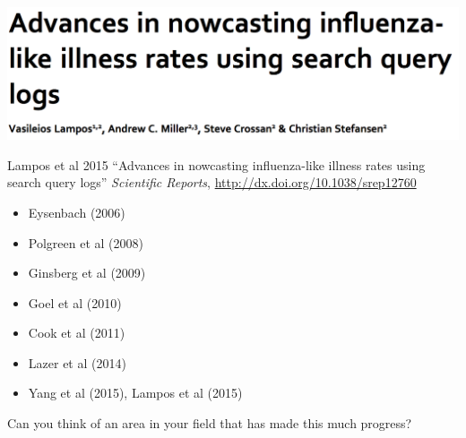 \documentclass[aspectratio=169]{beamer}
\begin{document}
\begin{frame}

\begin{center}
\includegraphics[width=\textwidth]{figures/lampos_advances_2015_title}
\end{center}

Lampos et al 2015 ``Advances in nowcasting influenza-like illness rates using search query logs'' \textit{Scientific Reports}, \url{http://dx.doi.org/10.1038/srep12760}

\end{frame}
\begin{frame}

\begin{itemize}
\item Eysenbach (2006)
\item Polgreen et al (2008)
\item Ginsberg et al (2009)
\item Goel et al (2010)
\item Cook et al (2011)
\item Lazer et al (2014)
\item Yang et al (2015), Lampos et al (2015)
\end{itemize}

\end{frame}
\begin{frame}

{\Large
\begin{center}
Can you think of an area in your field that has made this much progress?
\end{center}
}

\end{frame}
\end{document}
